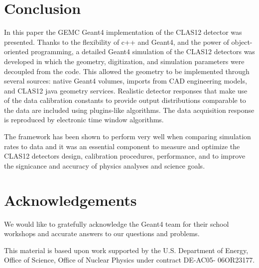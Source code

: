 \section{Conclusion}
In this paper the GEMC Geant4 implementation of the CLAS12 detector was presented.
Thanks to the flexibility of c++ and Geant4, and the power of object-oriented programming,
a detailed Geant4 simulation of the CLAS12 detectors was developed in which the geometry,
digitization, and simulation parameters were decoupled from the code.
This allowed the geometry to be implemented through several sources: native Geant4 volumes, imports from CAD engineering models,
and CLAS12 java geometry services. Realistic detector responses that
make use of the data calibration constants to provide output distributions comparable to the data are included
using plugins-like algorithms. The data acquisition response is reproduced by electronic time window algorithms.

The framework has been shown to perform very well when comparing simulation rates to data
and it was an essential component to measure and optimize the CLAS12 detectors design, calibration procedures, performance,
and to improve the signicance and accuracy of physics analyses and science goals.

\section{Acknowledgements}

We would like to gratefully acknowledge the Geant4 team
for their school workshops and accurate answers to our questions and problems.

This material is based upon work supported by the U.S. Department of Energy,
Office of Science, Office of Nuclear Physics under contract DE-AC05- 06OR23177.

